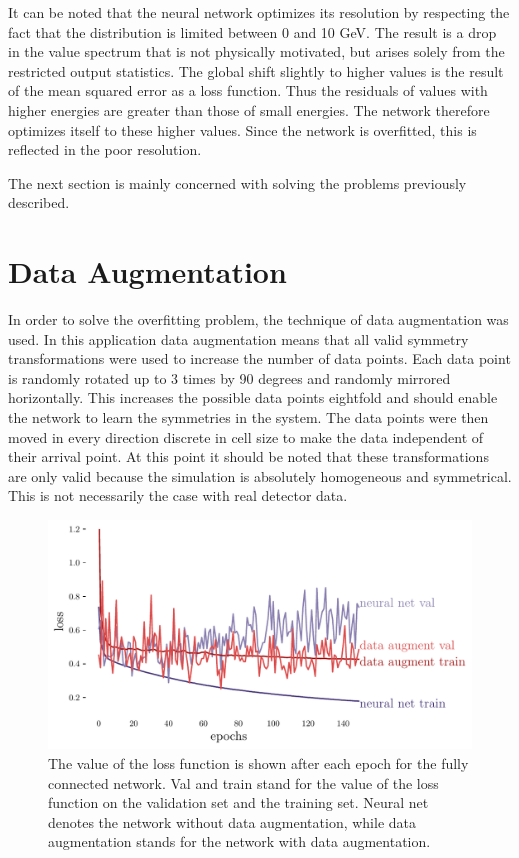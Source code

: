 \documentclass[12pt, a4paper]{thesis}
\begin{document}
It can be noted that the neural network optimizes its resolution by
respecting the fact that the distribution is limited between 0 and 10
GeV. The result is a drop in the value spectrum that is not physically
motivated, but arises solely from the restricted output statistics.
The global shift slightly to higher values is the result of the mean
squared error as a loss function. Thus the residuals of values with
higher energies are greater than those of small energies. The network
therefore optimizes itself to these higher values. Since the network
is overfitted, this is reflected in the poor resolution.

The next section is mainly concerned with solving the problems previously
described.

\section{Data Augmentation}
\label{sec:org4a347fb}

In order to solve the overfitting problem, the technique of data
augmentation was used. In this application data augmentation means
that all valid symmetry transformations were used to increase the
number of data points. Each data point is randomly rotated up to 3
times by 90 degrees and randomly mirrored horizontally. This increases
the possible data points eightfold and should enable the network to
learn the symmetries in the system. The data points were then moved in
every direction discrete in cell size to make the data independent of
their arrival point. At this point it should be noted that these
transformations are only valid because the simulation is absolutely
homogeneous and symmetrical. This is not necessarily the case with
real detector data.

\begin{figure}[H]
  \centering
  \includegraphics[width=.9\linewidth]{../images/data_augment_loss.pdf}
  \caption{The value of the loss function is shown after each epoch
    for the fully connected network. Val and train stand for the value
    of the loss function on the validation set and the training
    set. Neural net denotes the network without data augmentation,
    while data augmentation stands for the network with data
    augmentation.}
  \label{da_loss}
\end{figure} 
\end{document}
